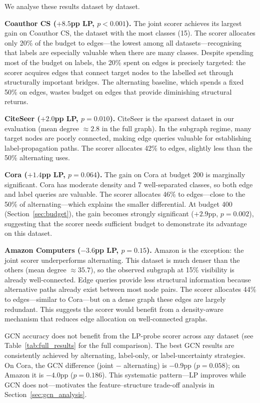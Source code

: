 \documentclass[12pt,a4paper,oneside]{report}
\begin{document}
We analyse these results dataset by dataset.

\textbf{Coauthor CS ($+8.5$pp LP, $p < 0.001$).} The joint scorer achieves its largest gain on Coauthor CS, the dataset with the most classes (15). The scorer allocates only 20\% of the budget to edges---the lowest among all datasets---recognising that labels are especially valuable when there are many classes. Despite spending most of the budget on labels, the 20\% spent on edges is precisely targeted: the scorer acquires edges that connect target nodes to the labelled set through structurally important bridges. The alternating baseline, which spends a fixed 50\% on edges, wastes budget on edges that provide diminishing structural returns.

\textbf{CiteSeer ($+2.0$pp LP, $p = 0.010$).} CiteSeer is the sparsest dataset in our evaluation (mean degree $\approx 2.8$ in the full graph). In the subgraph regime, many target nodes are poorly connected, making edge queries valuable for establishing label-propagation paths. The scorer allocates 42\% to edges, slightly less than the 50\% alternating uses.

\textbf{Cora ($+1.4$pp LP, $p = 0.064$).} The gain on Cora at budget 200 is marginally significant. Cora has moderate density and 7 well-separated classes, so both edge and label queries are valuable. The scorer allocates 46\% to edges---close to the 50\% of alternating---which explains the smaller differential. At budget 400 (Section~\ref{sec:budget}), the gain becomes strongly significant ($+2.9$pp, $p = 0.002$), suggesting that the scorer needs sufficient budget to demonstrate its advantage on this dataset.

\textbf{Amazon Computers ($-3.6$pp LP, $p = 0.15$).} Amazon is the exception: the joint scorer underperforms alternating. This dataset is much denser than the others (mean degree $\approx 35.7$), so the observed subgraph at 15\% visibility is already well-connected. Edge queries provide less structural information because alternative paths already exist between most node pairs. The scorer allocates 44\% to edges---similar to Cora---but on a dense graph these edges are largely redundant. This suggests the scorer would benefit from a density-aware mechanism that reduces edge allocation on well-connected graphs.

GCN accuracy does not benefit from the LP-probe scorer across any dataset (see Table~\ref{tab:full_results} for the full comparison). The best GCN results are consistently achieved by alternating, label-only, or label-uncertainty strategies. On Cora, the GCN difference (joint $-$ alternating) is $-0.9$pp ($p = 0.058$); on Amazon it is $-4.0$pp ($p = 0.186$). This systematic pattern---LP improves while GCN does not---motivates the feature--structure trade-off analysis in Section~\ref{sec:gcn_analysis}.
\end{document}
